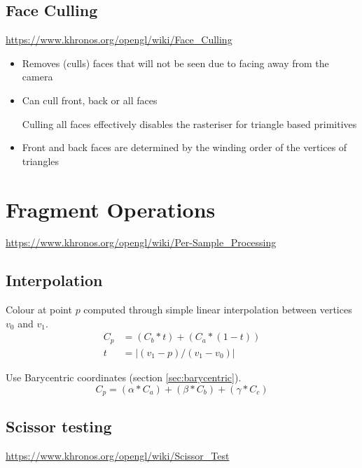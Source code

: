 \documentclass[a4paper]{article}
\begin{document}
\subsection{Face Culling}

\url{https://www.khronos.org/opengl/wiki/Face_Culling}

\begin{itemize}
  \item
    Removes (culls) faces that will not be seen due to facing away from the
    camera

  \item
    Can cull front, back or all faces

    Culling all faces effectively disables the rasteriser for triangle based
    primitives

  \item
    Front and back faces are determined by the winding order of the vertices of
    triangles

\end{itemize}

\section{Fragment Operations}
\label{sec:fragment_operations}

\url{https://www.khronos.org/opengl/wiki/Per-Sample_Processing}

\subsection{Interpolation}


Colour at point $p$ computed through simple linear interpolation between
vertices $v_{0}$ and $v_{1}$.
\begin{align*}
  C_{p} &= (C_{b} * t) + (C_{a} * (1 - t)) \\
  t &= |(v_{1} - p) / (v_{1} - v_{0})|
\end{align*}


Use Barycentric coordinates (section \ref{sec:barycentric}).
\[
  C_{p} = (\alpha * C_{a}) + (\beta * C_{b}) + (\gamma * C_{c})
\]

\subsection{Scissor testing}

\url{https://www.khronos.org/opengl/wiki/Scissor_Test}
\end{document}
